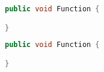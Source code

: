 \label{app:Listing2}
\begin{lstlisting}[language=Java, caption=NAME]
public void Function {

}
\end{lstlisting}
%
%
\begin{lstlisting}[language=Java, caption=NAME]
public void Function {

}
\end{lstlisting}